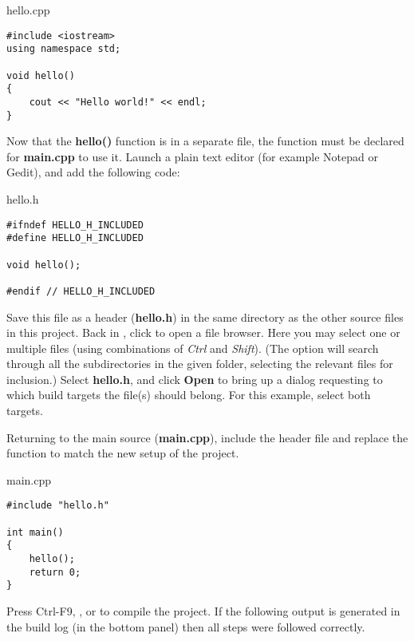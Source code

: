 hello.cpp
\begin{lstlisting}
#include <iostream>    
using namespace std;
  
void hello()
{
    cout << "Hello world!" << endl;
} 
\end{lstlisting}



Now that the \textbf{hello()} function is in a separate file, the function must be declared for \textbf{main.cpp} to use it. Launch a plain text editor (for example Notepad or Gedit), and add the following code:

hello.h 
\begin{lstlisting}
#ifndef HELLO_H_INCLUDED
#define HELLO_H_INCLUDED
     
void hello();
     
#endif // HELLO_H_INCLUDED
\end{lstlisting}

Save this file as a header (\textbf{hello.h}) in the same directory as the other source files in this project. Back in \codeblocks, click  to open a file browser. Here you may select one or multiple files (using combinations of \textit{Ctrl} and \textit{Shift}). (The option  will search through all the subdirectories in the given folder, selecting the relevant files for inclusion.) Select \textbf{hello.h}, and click \textbf{Open} to bring up a dialog requesting to which build targets the file(s) should belong. For this example, select both targets. 



Returning to the main source (\textbf{main.cpp}), include the header file and replace the  function to match the new setup of the project.

main.cpp
\begin{lstlisting}
#include "hello.h"

int main()
{
    hello();
    return 0;
}
\end{lstlisting}

Press Ctrl-F9, , or  to compile the project. If the following output is generated in the build log (in the bottom panel) then all steps were followed correctly.

